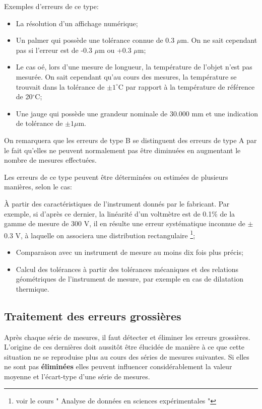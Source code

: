 Exemples d'erreurs de ce type:
\begin{itemize}

\item La résolution d'un affichage numérique;
\item Un palmer qui possède une tolérance connue de 0.3 $\mu$m. On ne sait cependant pas si l'erreur est de -0.3 $\mu$m ou +0.3 $\mu$m;
\item Le cas oé, lors d'une mesure de longueur, la température de l'objet n'est pas mesurée. On sait cependant qu'au cours des mesures, la température se trouvait dans la tolérance de $\pm1^{\circ}$C par rapport à la température de référence de 20$^{\circ}$C;
\item Une jauge qui possède une grandeur nominale de 30.000 mm et une indication de tolérance de $\pm 1\mu$m.
\end{itemize}
On remarquera que les erreurs de type B se distinguent des erreurs de type A par le fait qu'elles ne peuvent normalement pas être diminuées en augmentant le nombre de mesures effectuées.

Les erreurs de ce type peuvent être déterminées ou estimées de plusieurs manières, selon le cas:

À partir des caractéristiques de l'instrument donnés par le fabricant. Par exemple, si d'après ce dernier, la linéarité d'un voltmètre est de 0.1\% de la gamme de mesure de 300 V, il en résulte une erreur systématique inconnue de $\pm$0.3 V, à laquelle on associera une distribution rectangulaire \footnote{voir le cours " Analyse de données en sciences expérimentales "};
\begin{itemize}
\item Comparaison avec un instrument de mesure au moins dix fois plus précis;
\item Calcul des tolérances à partir des tolérances mécaniques et des relations géométriques de l'instrument de mesure, par exemple en cas de dilatation thermique.
\end{itemize}

\subsection{Traitement des erreurs grossières}

Après chaque série de mesures, il faut détecter et éliminer les erreurs grossières. L'origine de ces dernières doit aussitôt être élucidée de manière à ce que cette situation ne se reproduise plus au cours des séries de mesures suivantes. Si elles ne sont pas \textbf{éliminées} elles peuvent influencer considérablement la valeur moyenne et l'écart-type d'une série de mesures.

